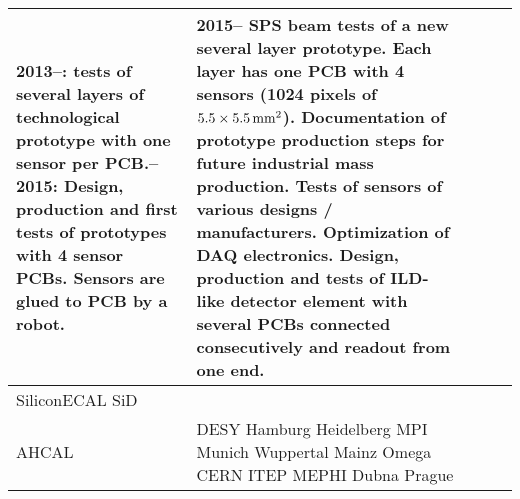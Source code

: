 \begin{landscape}
\begin{sidewaystable}
\begin{adjustbox}{max width=1.1\textwidth,totalheight=1\textheight}
\begin{tabularx}{2\textheight}{lXXXX}
    2013--: tests of several layers of technological prototype with one sensor per PCB.\newline
    2014--2015: Design, production and first tests of prototypes with 4 sensor PCBs. Sensors are glued to PCB by a robot. &
    2015-- SPS beam tests of a new several layer prototype. Each layer has one PCB with 4 sensors (1024 pixels of $\unit[5.5\times 5.5]{mm^2}$).\newline
    Documentation of prototype production steps for future industrial mass production.\newline
    Tests of sensors of various designs / manufacturers.\newline
    Optimization of DAQ electronics.\newline
    Design, production and tests of ILD-like detector element with several PCBs connected consecutively and readout from one end. \\
    \midrule
    SiliconECAL SiD &
    &                                                                                                                                                                                                                                                                                                                                                                                      &                                                                                                                                                                                                                                                                 &                                                                                                                                                                                                                                     \\
    \midrule
    AHCAL &
    DESY\newline
    Hamburg\newline
    Heidelberg\newline
    MPI Munich \newline
    Wuppertal\newline
    Mainz\newline
    Omega\newline
    CERN\newline
    ITEP\newline
    MEPHI\newline
    Dubna\newline
    Prague\newline

\end{tabularx}
\end{adjustbox}
\end{sidewaystable}
\end{landscape}
